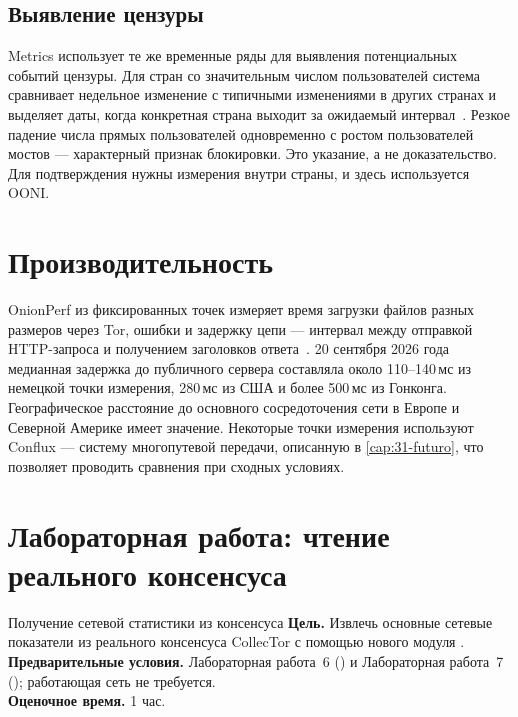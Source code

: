 \subsection{Выявление цензуры}

Metrics использует те же временные ряды для выявления потенциальных событий цензуры. Для стран со значительным числом пользователей система сравнивает недельное изменение с типичными изменениями в других странах и выделяет даты, когда конкретная страна выходит за ожидаемый интервал~\cite{metricsreproducible}. Резкое падение числа прямых пользователей одновременно с ростом пользователей мостов — характерный признак блокировки. Это указание, а не доказательство. Для подтверждения нужны измерения внутри страны, и здесь используется OONI.

\section{Производительность}\label{sec:metrics-prestazioni}

OnionPerf из фиксированных точек измеряет время загрузки файлов разных размеров через Tor, ошибки и задержку цепи — интервал между отправкой HTTP-запроса и получением заголовков ответа~\cite{metricsreproducible}. 20 сентября 2026 года медианная задержка до публичного сервера составляла около 110--140\,мс из немецкой точки измерения, 280\,мс из США и более 500\,мс из Гонконга. Географическое расстояние до основного сосредоточения сети в Европе и Северной Америке имеет значение. Некоторые точки измерения используют Conflux — систему многопутевой передачи, описанную в \cref{cap:31-futuro}, что позволяет проводить сравнения при сходных условиях.

\section{Лабораторная работа: чтение реального консенсуса}\label{sec:lab-metrics}

\begin{laboratorio}[15]{Получение сетевой статистики из консенсуса}
\textbf{Цель.} Извлечь основные сетевые показатели из реального консенсуса CollecTor с помощью нового модуля .\\
\textbf{Предварительные условия.} Лабораторная работа~6 () и Лабораторная работа~7 (); работающая сеть не требуется.\\
\textbf{Оценочное время.} 1 час.
\end{laboratorio}

